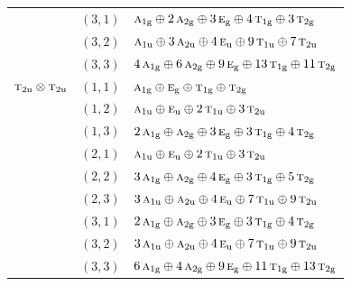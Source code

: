 \documentclass[11pt]{article}
\newcommand{\irr}[1]{\text{\normalfont\scshape #1}}
\newcommand{\ptag}[1]{\mathrm{#1}}
\begin{document}
\begin{longtable}{p{} c p{}}
 & $(3,1)$ & $\irr{a}_{1\ptag{g}}\oplus 2\,\irr{a}_{2\ptag{g}}\oplus 3\,\irr{e}_{\ptag{g}}\oplus 4\,\irr{t}_{1\ptag{g}}\oplus 3\,\irr{t}_{2\ptag{g}}$\\

 & $(3,2)$ & $\irr{a}_{1\ptag{u}}\oplus 3\,\irr{a}_{2\ptag{u}}\oplus 4\,\irr{e}_{\ptag{u}}\oplus 9\,\irr{t}_{1\ptag{u}}\oplus 7\,\irr{t}_{2\ptag{u}}$\\

 & $(3,3)$ & $4\,\irr{a}_{1\ptag{g}}\oplus 6\,\irr{a}_{2\ptag{g}}\oplus 9\,\irr{e}_{\ptag{g}}\oplus 13\,\irr{t}_{1\ptag{g}}\oplus 11\,\irr{t}_{2\ptag{g}}$\\

\hline

$\irr{t}_{2\ptag{u}}\otimes \irr{t}_{2\ptag{u}}$ & $(1,1)$ & $\irr{a}_{1\ptag{g}}\oplus \irr{e}_{\ptag{g}}\oplus \irr{t}_{1\ptag{g}}\oplus \irr{t}_{2\ptag{g}}$\\

 & $(1,2)$ & $\irr{a}_{1\ptag{u}}\oplus \irr{e}_{\ptag{u}}\oplus 2\,\irr{t}_{1\ptag{u}}\oplus 3\,\irr{t}_{2\ptag{u}}$\\

 & $(1,3)$ & $2\,\irr{a}_{1\ptag{g}}\oplus \irr{a}_{2\ptag{g}}\oplus 3\,\irr{e}_{\ptag{g}}\oplus 3\,\irr{t}_{1\ptag{g}}\oplus 4\,\irr{t}_{2\ptag{g}}$\\

 & $(2,1)$ & $\irr{a}_{1\ptag{u}}\oplus \irr{e}_{\ptag{u}}\oplus 2\,\irr{t}_{1\ptag{u}}\oplus 3\,\irr{t}_{2\ptag{u}}$\\

 & $(2,2)$ & $3\,\irr{a}_{1\ptag{g}}\oplus \irr{a}_{2\ptag{g}}\oplus 4\,\irr{e}_{\ptag{g}}\oplus 3\,\irr{t}_{1\ptag{g}}\oplus 5\,\irr{t}_{2\ptag{g}}$\\

 & $(2,3)$ & $3\,\irr{a}_{1\ptag{u}}\oplus \irr{a}_{2\ptag{u}}\oplus 4\,\irr{e}_{\ptag{u}}\oplus 7\,\irr{t}_{1\ptag{u}}\oplus 9\,\irr{t}_{2\ptag{u}}$\\

 & $(3,1)$ & $2\,\irr{a}_{1\ptag{g}}\oplus \irr{a}_{2\ptag{g}}\oplus 3\,\irr{e}_{\ptag{g}}\oplus 3\,\irr{t}_{1\ptag{g}}\oplus 4\,\irr{t}_{2\ptag{g}}$\\

 & $(3,2)$ & $3\,\irr{a}_{1\ptag{u}}\oplus \irr{a}_{2\ptag{u}}\oplus 4\,\irr{e}_{\ptag{u}}\oplus 7\,\irr{t}_{1\ptag{u}}\oplus 9\,\irr{t}_{2\ptag{u}}$\\

 & $(3,3)$ & $6\,\irr{a}_{1\ptag{g}}\oplus 4\,\irr{a}_{2\ptag{g}}\oplus 9\,\irr{e}_{\ptag{g}}\oplus 11\,\irr{t}_{1\ptag{g}}\oplus 13\,\irr{t}_{2\ptag{g}}$\\

\hline

\end{longtable}
\end{document}
